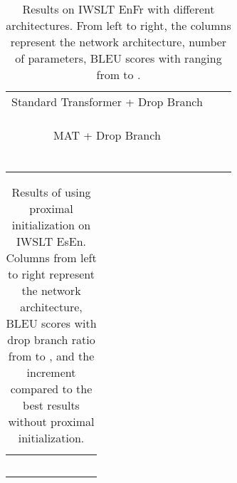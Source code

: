 \documentclass{article}
\begin{document}
\begin{table}[!htbp]
\centering
\small
\caption{Results on IWSLT EnFr with different architectures. From left to right, the columns represent the network architecture, number of parameters, BLEU scores with  ranging from  to .}
\begin{tabular}{lcccccc}
\toprule
 &   &  &  &   \\
\midrule
\multicolumn{5}{c}{Standard Transformer + Drop Branch} \\ 
\midrule
 &     &  &     &    \\
 &	 &	 &	 &	  \\
 &	 &	 &    &	  \\
\midrule
\multicolumn{5}{c}{MAT + Drop Branch} \\
\midrule
 &     &  &  &  \\
 &     &  &  &   \\
 &     &  &  &   \\
 &     &  &  &  \\
 & 	 &  &  &  \\
 & 	 &  &  &  \\
\bottomrule
\end{tabular}
\label{tab:iwslt_enfr_multi-branch_attn}
\end{table}















\begin{table}[!htbp]
\centering
\caption{Results of using proximal initialization on IWSLT EsEn. Columns from left to right represent the network architecture, BLEU scores with drop branch ratio  from  to , and the increment compared to the best results without proximal initialization.}
\begin{tabular}{cccccccc}
\toprule
&     &    &    &     &    \\
\midrule
 &   &	 &  &   &  \\
 &   &		&  &	  &  \\
 &   &		&  &	  &  \\
 &   & 	&  &   &  \\
 &   &		&  &	  &  \\
\bottomrule
\end{tabular}
\label{tab:result_iwslt_esen}
\end{table}
\end{document}
